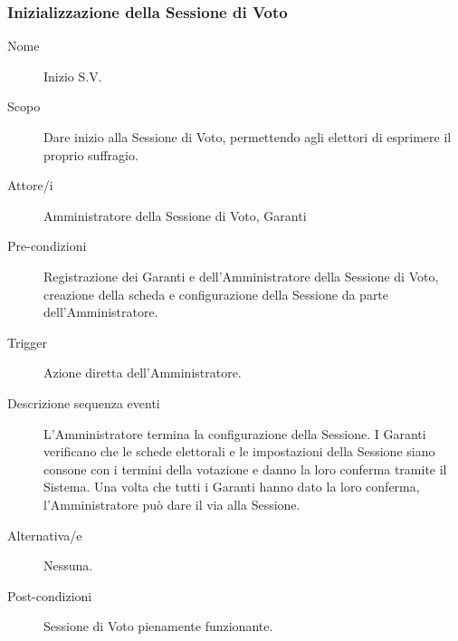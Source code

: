 \subsubsection{Inizializzazione della Sessione di Voto}
\begin{description}
	\item[Nome] Inizio S.V.
	\item[Scopo] Dare inizio alla Sessione di Voto, permettendo agli elettori di esprimere il proprio suffragio.
	\item[Attore/i] Amministratore della Sessione di Voto, Garanti
	\item[Pre-condizioni] Registrazione dei Garanti e dell'Amministratore della Sessione di Voto, creazione della scheda e configurazione della Sessione da parte dell'Amministratore.
	\item[Trigger] Azione diretta dell'Amministratore.
	\item[Descrizione sequenza eventi] L'Amministratore termina la configurazione della Sessione. I Garanti verificano che le schede elettorali e le impostazioni della Sessione siano consone con i termini della votazione e danno la loro conferma tramite il Sistema. Una volta che tutti i Garanti hanno dato la loro conferma, l'Amministratore può dare il via alla Sessione.
	\item[Alternativa/e] Nessuna.
	\item[Post-condizioni] Sessione di Voto pienamente funzionante.
\end{description}
